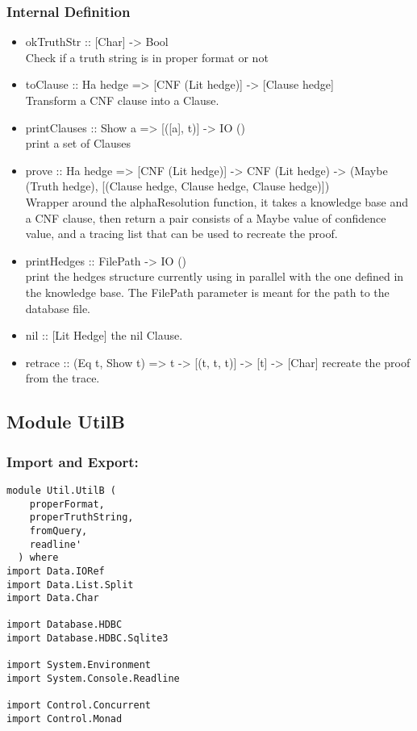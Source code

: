 \documentclass[../gr-final.tex]{subfiles}
\begin{document}
\subsubsection{Internal Definition}
\begin{itemize}
        \item okTruthStr :: [Char] -> Bool\\
         Check if a truth string is in proper format or not
        \item toClause :: Ha hedge => [CNF (Lit hedge)] ->
                [Clause hedge]\\
              Transform a CNF clause into a Clause.  
        \item printClauses :: Show a => [([a], t)] -> IO ()\\
                print a set of Clauses
        \item prove :: Ha hedge => [CNF (Lit hedge)] -> CNF (Lit hedge) ->
           (Maybe (Truth hedge), [(Clause hedge, Clause hedge, Clause hedge)])\\
            Wrapper around the alphaResolution function, it takes
            a knowledge base and a CNF clause, then return a pair
            consists of a Maybe value of confidence value, and a
            tracing list that can be used to recreate the proof.          
        \item printHedges :: FilePath -> IO ()\\
                print the hedges structure currently using in
                parallel with the one defined in the knowledge base. The FilePath
                parameter is meant for the path to the database
                file.
        \item nil :: [Lit Hedge]
                the nil Clause.
        \item retrace :: (Eq t, Show t) => t -> [(t, t, t)] -> [t] -> [Char]
                recreate the proof from the trace.
\end{itemize}
\subsection{Module UtilB}
\subsubsection{Import and Export:}
\begin{lstlisting}
module Util.UtilB (
    properFormat,
    properTruthString,
    fromQuery,
    readline'
  ) where
import Data.IORef
import Data.List.Split
import Data.Char

import Database.HDBC
import Database.HDBC.Sqlite3

import System.Environment
import System.Console.Readline

import Control.Concurrent
import Control.Monad
\end{lstlisting}
\end{document}

